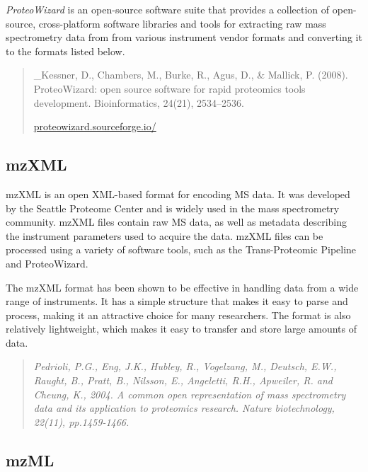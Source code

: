 \documentclass[
]{book}
\begin{document}
\emph{ProteoWizard} is an open-source software suite that provides a collection of open-source, cross-platform software libraries and tools for extracting raw mass spectrometry data from from various instrument vendor formats and converting it to the formats listed below.

\begin{quote}
\_Kessner, D., Chambers, M., Burke, R., Agus, D., \& Mallick, P. (2008). ProteoWizard: open source software for rapid proteomics tools development. Bioinformatics, 24(21), 2534--2536.

\href{https://proteowizard.sourceforge.io/}{proteowizard.sourceforge.io/}
\end{quote}

\hypertarget{mzxml}{%
\subsection*{mzXML}\label{mzxml}}

mzXML is an open XML-based format for encoding MS data. It was developed by the Seattle Proteome Center and is widely used in the mass spectrometry community. mzXML files contain raw MS data, as well as metadata describing the instrument parameters used to acquire the data. mzXML files can be processed using a variety of software tools, such as the Trans-Proteomic Pipeline and ProteoWizard.

The mzXML format has been shown to be effective in handling data from a wide range of instruments. It has a simple structure that makes it easy to parse and process, making it an attractive choice for many researchers. The format is also relatively lightweight, which makes it easy to transfer and store large amounts of data.

\begin{quote}
\emph{Pedrioli, P.G., Eng, J.K., Hubley, R., Vogelzang, M., Deutsch, E.W., Raught, B., Pratt, B., Nilsson, E., Angeletti, R.H., Apweiler, R. and Cheung, K., 2004. A common open representation of mass spectrometry data and its application to proteomics research. Nature biotechnology, 22(11), pp.1459-1466.}
\end{quote}

\hypertarget{mzml}{%
\subsection*{mzML}\label{mzml}}
\end{document}

